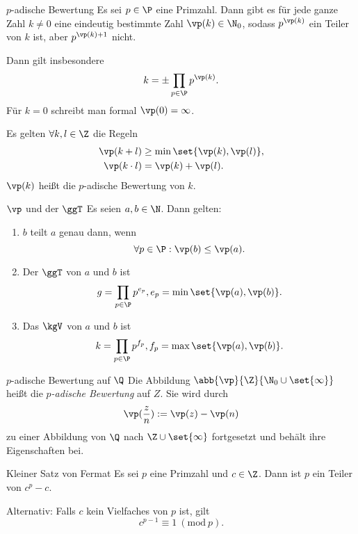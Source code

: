 \begin{karte}{\(p\)-adische Bewertung}
    Es sei \(p\in \P\) eine Primzahl. Dann gibt es für jede ganze Zahl \(k\neq 0\)
    eine eindeutig bestimmte Zahl \(\vp(k)\in \N_0\), sodass \(p^{\vp(k)}\) 
    ein Teiler von \(k\) ist, aber \(p^{\vp(k)+1}\) nicht. 

    Dann gilt insbesondere 
    \[ k=\pm \prod_{p\in\P} p^{\vp(k)}. \]
    Für \(k=0\) schreibt man formal \(\vp(0)=\infty\).

    Es gelten \(\forall k,l\in\Z\) die Regeln 
    \begin{align*}
        \vp(k+l) &\geq \min \set{\vp(k), \vp(l)}, \\
        \vp(k\cdot l) &= \vp(k) + \vp(l).
    \end{align*}
    \(\vp(k)\) heißt die \(p\)-adische Bewertung von \(k\).
\end{karte}

\begin{karte}{\(\vp\) und der \(\ggT\)}
    Es seien \(a,b\in \N\). Dann gelten:
    \begin{enumerate}
        \item \(b\) teilt \(a\) genau dann, wenn 
        \[ \forall p\in\P: \vp(b)\leq \vp(a). \]
        \item Der \(\ggT\) von \(a\) und \(b\) ist 
        \[ g=\prod_{p\in \P} p^{e_p}, e_p = \min \set{\vp(a),\vp(b)}. \]
        \item Das \(\kgV\) von \(a\) und \(b\) ist 
        \[ k=\prod_{p\in \P} p^{f_p}, f_p = \max \set{\vp(a),\vp(b)}. \]
    \end{enumerate}
\end{karte}

\begin{karte}{\(p\)-adische Bewertung auf \(\Q\)}
    Die Abbildung \(\abb{\vp}{\Z}{\N_0\cup \set{\infty}}\) heißt die \textit{\(p\)-adische Bewertung} auf 
    \(Z\). Sie wird durch 
    \[ \vp(\frac{z}{n}) := \vp(z) - \vp(n) \] 
    zu einer Abbildung von \(\Q\) nach \(\Z\cup \set{\infty}\) fortgesetzt und behält 
    ihre Eigenschaften bei. 
\end{karte}

\begin{karte}{Kleiner Satz von Fermat}
    Es sei \(p\) eine Primzahl und \(c\in \Z\). Dann ist \(p\) ein Teiler von 
    \(c^p - c\). 
    
    Alternativ: Falls \(c\) kein Vielfaches von \(p\) ist, gilt 
    \[ c^{p-1} \equiv 1\ (\mathrm{mod}\ p). \]
\end{karte}

